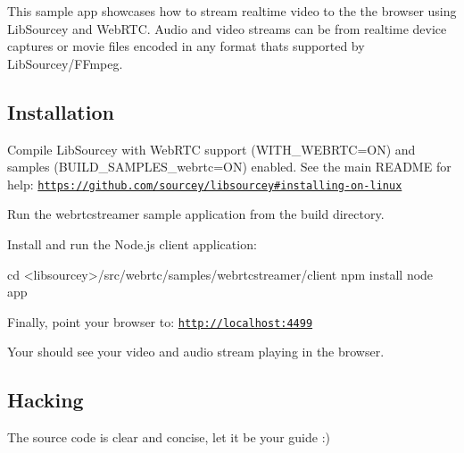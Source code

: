 This sample app showcases how to stream realtime video to the the browser using Lib\+Sourcey and Web\+R\+TC. Audio and video streams can be from realtime device captures or movie files encoded in any format that\textquotesingle{}s supported by Lib\+Sourcey/\+F\+Fmpeg.

\subsection*{Installation}


\begin{DoxyEnumerate}
\item Compile Lib\+Sourcey with Web\+R\+TC support ({\ttfamily W\+I\+T\+H\+\_\+\+W\+E\+B\+R\+TC=ON}) and samples ({\ttfamily B\+U\+I\+L\+D\+\_\+\+S\+A\+M\+P\+L\+E\+S\+\_\+webrtc=ON}) enabled. See the main R\+E\+A\+D\+ME for help\+: \href{https://github.com/sourcey/libsourcey#installing-on-linux}{\tt https\+://github.\+com/sourcey/libsourcey\#installing-\/on-\/linux}
\item Run the {\ttfamily webrtcstreamer} sample application from the {\ttfamily build} directory.
\end{DoxyEnumerate}
\begin{DoxyEnumerate}
\item Install and run the Node.\+js client application\+:
\end{DoxyEnumerate}


\begin{DoxyCode}
cd <libsourcey>/src/webrtc/samples/webrtcstreamer/client
npm install
node app
\end{DoxyCode}



\begin{DoxyEnumerate}
\item Finally, point your browser to\+: {\ttfamily \href{http://localhost:4499}{\tt http\+://localhost\+:4499}}
\item Your should see your video and audio stream playing in the browser.
\end{DoxyEnumerate}

\subsection*{Hacking}

The source code is clear and concise, let it be your guide \+:) 